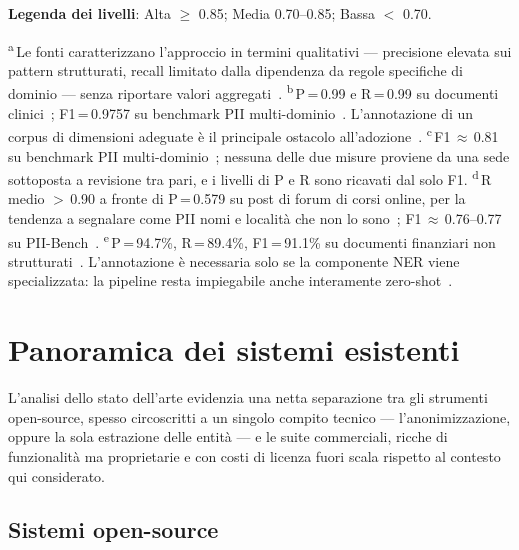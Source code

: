 \begin{table}
	\raggedright\scriptsize
	\textbf{Legenda dei livelli}: Alta $\geq$ 0.85; Media 0.70--0.85; Bassa $<$ 0.70.\par\vspace{0.2em}
	\textsuperscript{a}\,Le fonti caratterizzano l'approccio in termini qualitativi --- precisione elevata sui pattern strutturati, recall limitato dalla dipendenza da regole specifiche di dominio --- senza riportare valori aggregati~\cite{elazarWhatsMyBigData2024, keraghelRecentAdvancesNamed2024}.\quad
	\textsuperscript{b}\,P\,=\,0.99 e R\,=\,0.99 su documenti clinici~\cite{zambareFairEfficientDeidentification2026}; F1\,=\,0.9757 su benchmark PII multi-dominio~\cite{DeBERTaai4privacy}. L'annotazione di un corpus di dimensioni adeguate è il principale ostacolo all'adozione~\cite{africanoPIIDetectionLowResource2024}.\quad
	\textsuperscript{c}\,F1\,$\approx$\,0.81 su benchmark PII multi-dominio~\cite{ComparingBestNERProtecto2025, KnowledgatorGlinerpiibasev10HuggingFace2026}; nessuna delle due misure proviene da una sede sottoposta a revisione tra pari, e i livelli di P e R sono ricavati dal solo F1.\quad
	\textsuperscript{d}\,R medio $>$\,0.90 a fronte di P\,=\,0.579 su post di forum di corsi online, per la tendenza a segnalare come PII nomi e località che non lo sono~\cite{zambranoDeidentifyingStudentPersonally2025}; F1\,$\approx$\,0.76--0.77 su PII-Bench~\cite{shenPIIBenchEvaluatingQueryAware2026}.\quad
	\textsuperscript{e}\,P\,=\,94.7\%, R\,=\,89.4\%, F1\,=\,91.1\% su documenti finanziari non strutturati~\cite{mishraHybridRulebasedNLP2025}. L'annotazione è necessaria solo se la componente NER viene specializzata: la pipeline resta impiegabile anche interamente zero-shot~\cite{rajgarhiaEvaluationStudyHybrid2025}.
\end{table}

\section{Panoramica dei sistemi esistenti} %
\label{sec:panoramica-sistemi}
L'analisi dello stato dell'arte evidenzia una netta separazione tra gli strumenti open-source, spesso circoscritti a un singolo compito tecnico --- l'anonimizzazione, oppure la sola estrazione delle entità --- e le suite commerciali, ricche di funzionalità ma proprietarie e con costi di licenza fuori scala rispetto al contesto qui considerato.
\subsection{Sistemi open-source}
\label{sub:sistemi-open-source}

